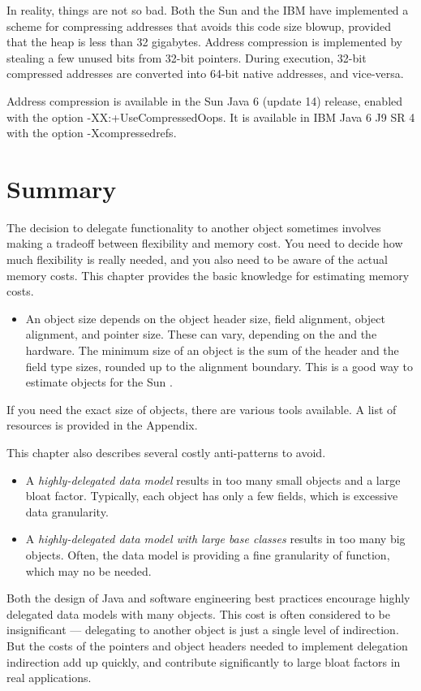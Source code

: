 In reality, things are not so bad. Both the Sun and the IBM \jres have
implemented a scheme for compressing addresses that avoids this code size blowup, provided that the heap is less than 32 gigabytes. Address compression is implemented by stealing a few unused bits from 32-bit pointers. During execution, 32-bit compressed addresses are converted into 64-bit native addresses, and vice-versa.

Address compression is available in the Sun Java 6 (update 14) release, enabled with the option -XX:+UseCompressedOops. It is available in IBM Java 6 J9 SR 4 with the option -Xcompressedrefs.

\section{Summary}

The decision to delegate functionality to another object sometimes involves making a tradeoff between flexibility and memory cost. You need to decide how much flexibility is really needed, and you also need to be aware of the actual memory costs. This chapter provides the basic knowledge for estimating memory costs. 
\begin{itemize}
\item An object size depends on the object header size, field alignment, object
alignment, and pointer size. These can vary, depending on the \jre and the
hardware. The minimum size of an object is the sum of the header and the field
type sizes, rounded up to the alignment boundary. This is a good way to
estimate objects for the Sun \jre.
\end{itemize}
If you need the exact size of objects, there are various tools available. A list of resources is provided in the Appendix.

This chapter also describes several costly anti-patterns to avoid.
\begin{itemize}
\item A \textit{highly-delegated data model} results in too many small objects and a large bloat factor. Typically, each object has only a few fields, which is excessive data granularity.  
\item A \textit{highly-delegated data model with large base classes} results in too many big objects. Often, the data model is providing a fine granularity of function, which may no be needed.
\end{itemize}   

Both the design of Java and software engineering best practices encourage highly delegated data models with many objects. This cost is often considered to be insignificant --- delegating to another object is just a single level of indirection. But the costs of the pointers and object headers needed to implement delegation indirection add up quickly, and contribute significantly to large bloat factors in real applications. 

  

